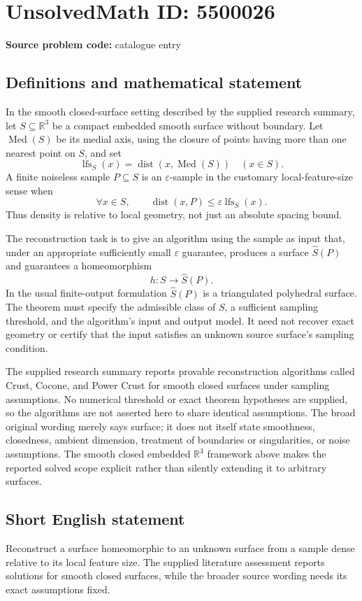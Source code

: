 \documentclass[11pt]{article}
\newcommand{\R}{\mathbb{R}}
\begin{document}
\section*{UnsolvedMath ID: 5500026}
\textbf{Source problem code:} catalogue entry
\subsection{Definitions and mathematical statement}
In the smooth closed-surface setting described by the supplied research summary, let \(S\subseteq\R^3\) be a compact embedded smooth surface without boundary. Let \(\operatorname{Med}(S)\) be its medial axis, using the closure of points having more than one nearest point on \(S\), and set
\[
\operatorname{lfs}_S(x)=\operatorname{dist}(x,\operatorname{Med}(S))\quad(x\in S).
\]
A finite noiseless sample \(P\subseteq S\) is an \(\varepsilon\)-sample in the customary local-feature-size sense when
\[
\forall x\in S,\qquad \operatorname{dist}(x,P)\le
\varepsilon\operatorname{lfs}_S(x).
\]
Thus density is relative to local geometry, not just an absolute spacing bound.

The reconstruction task is to give an algorithm using the sample as input that, under an appropriate sufficiently small \(\varepsilon\) guarantee, produces a surface \(\widehat S(P)\) and guarantees a homeomorphism
\[
h:S\longrightarrow\widehat S(P).
\]
In the usual finite-output formulation \(\widehat S(P)\) is a triangulated polyhedral surface. The theorem must specify the admissible class of \(S\), a sufficient sampling threshold, and the algorithm's input and output model. It need not recover exact geometry or certify that the input satisfies an unknown source surface's sampling condition.

The supplied research summary reports provable reconstruction algorithms called Crust, Cocone, and Power Crust for smooth closed surfaces under sampling assumptions. No numerical threshold or exact theorem hypotheses are supplied, so the algorithms are not asserted here to share identical assumptions. The broad original wording merely says surface; it does not itself state smoothness, closedness, ambient dimension, treatment of boundaries or singularities, or noise assumptions. The smooth closed embedded \(\R^3\) framework above makes the reported solved scope explicit rather than silently extending it to arbitrary surfaces.
\subsection{Short English statement}
Reconstruct a surface homeomorphic to an unknown surface from a sample dense relative to its local feature size. The supplied literature assessment reports solutions for smooth closed surfaces, while the broader source wording needs its exact assumptions fixed.
\end{document}
